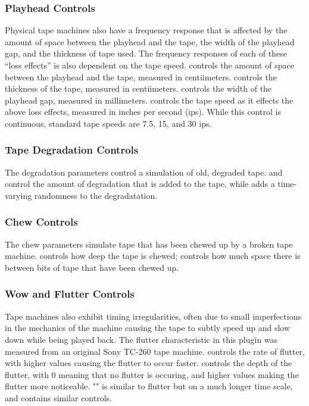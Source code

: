 \documentclass[landscape,twocolumn,a5paper]{manual}
\begin{document}
\subsubsection{Playhead Controls}
Physical tape machines also have a frequency response that
is affected by the amount of space between the playhead and
the tape, the width of the playhead gap, and the thickness
of tape used. The frequency responses of each of these ``loss
effects'' is also dependent on the tape speed.
\newpar
{}
controls the amount of space between the playhead and the tape,
measured in centiimeters.
\newpar
{} controls the thickness
of the tape, measured in centiimeters.
\newpar
{} controls
the width of the playhead gap, measured in millimeters.
\newpar
{}
controls the tape speed as it effects the above loss effects,
measured in inches per second (ips). While this control is
continuous, standard tape speeds are 7.5, 15, and 30 ips.

\subsubsection{Tape Degradation Controls}
The degradation parameters control a simulation of old, degraded
tape.
\newpar
{} and  control the amount of
degradation that is added to the tape, while 
adds a time-varying randomness to the degradatation.

\subsubsection{Chew Controls}
The chew parameters simulate tape that has been chewed up by
a broken tape machine.
\newpar
{} controls how deep the tape is chewed;
\newpar
{} controls how much space there is between
bits of tape that have been chewed up.

\subsubsection{Wow and Flutter Controls}
Tape machines also exhibit timing irregularities, often due
to small imperfections in the mechanics of the machine causing
the tape to subtly speed up and slow down while being
played back. The flutter characteristic in this plugin was
measured from an original Sony TC-260 tape machine.
\newpar
{} controls the rate of flutter, with higher values
causing the flutter to occur faster.
\newpar
{} controls the depth of the flutter, with 0 meaning
that no flutter is occuring, and higher values making the flutter
more noticeable.
\newpar
"" is similar to flutter but on a much longer time scale,
and contains similar controls.
\end{document}
